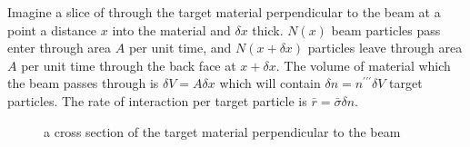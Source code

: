 Imagine a slice of through the target material perpendicular to the beam at a point a distance $x$ into the material and $\delta x$ thick.
$N(x)$ beam particles pass enter through area $A$ per unit time, and $N(x+\delta x)$ particles leave through area $A$ per unit time through the back face at $x+\delta x$.
The volume of material which the beam passes through is $\delta V=A \delta x$ which will contain $\delta n = n^{\prime\prime\prime}\delta V$ target particles.
The rate of interaction per target particle is $\bar{r}=\bar{\sigma} \delta n$.
\begin{figure}[h]
  \centering

\caption{a cross section of the target material perpendicular to the beam} \label{fig:attenuation}
\end{figure}
